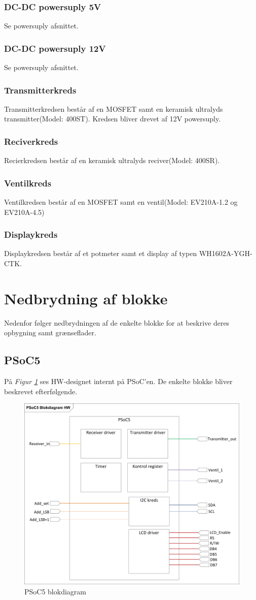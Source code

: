 \subsubsection{DC-DC powersuply 5V}
Se powersuply afsnittet.
\subsubsection{DC-DC powersuply 12V}
Se powersuply afsnittet.
\subsubsection{Transmitterkreds}
Transmitterkredsen består af en MOSFET samt en keramisk ultralyds transmitter(Model: 400ST). Kredsen bliver drevet af 12V powersuply. 
\subsubsection{Reciverkreds}
Recierkredsen består af en keramisk ultralyds reciver(Model: 400SR).
\subsubsection{Ventilkreds}
Ventilkredsen består af en MOSFET samt en ventil(Model: EV210A-1.2 og EV210A-4.5)
\subsubsection{Displaykreds}
Displaykredsen består af et potmeter samt et display af typen WH1602A-YGH-CTK.
\section{Nedbrydning af blokke}
Nedenfor følger nedbrydningen af de enkelte blokke for at beskrive deres opbygning samt grænseflader.
\subsection{PSoC5}
På \textit{Figur \ref{fig:PSoCBlok}} ses HW-designet internt på PSoC'en. De enkelte blokke bliver beskrevet efterfølgende.
\begin{figure}[H]
\centering
\includegraphics[width=.75\textwidth]{billeder/PSoCBlock}
\caption{PSoC5 blokdiagram}
\label{fig:PSoCBlok}
\end{figure}
